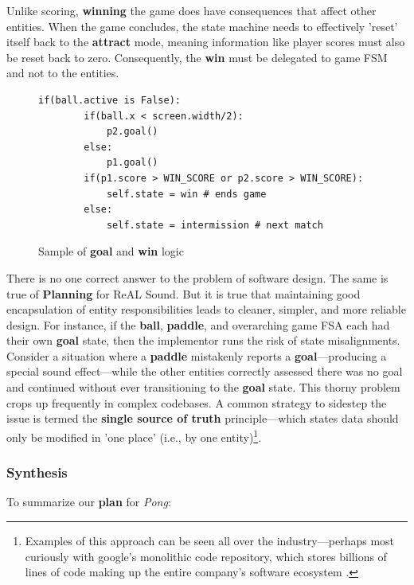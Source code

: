 \documentclass{report}
\newcommand{\rs}{ReAL Sound\xspace}
\newcommand{\plan}{\textbf{Planning}\xspace}
\newcommand{\state}[1]{\textbf{#1}}
\newcommand{\pad}{\textbf{paddle}\xspace}
\newcommand{\ball}{\textbf{ball}\xspace}
\newcommand{\tech}[1]{\textbf{#1}}
\begin{document}
Unlike scoring, \state{winning} the game does have consequences that affect other entities. When the game concludes, the state machine needs to effectively 'reset' itself back to the \state{attract} mode, meaning information like player scores must also be reset back to zero. Consequently, the \state{win} must be delegated to game FSM and not to the entities.   

\begin{figure}[h]

    \lstset{language=Python}
    \begin{lstlisting}[frame=single]
    if(ball.active is False):
        if(ball.x < screen.width/2):
            p2.goal()
        else:
            p1.goal()
        if(p1.score > WIN_SCORE or p2.score > WIN_SCORE):
            self.state = win # ends game
        else: 
            self.state = intermission # next match
    \end{lstlisting}
    
    \caption{Sample of \state{goal} and \state{win} logic}
    \label{fig:code_goal_example}
\end{figure}


There is no one correct answer to the problem of software design. The same is true of \plan for \rs. But it is true that maintaining good encapsulation of entity responsibilities leads to cleaner, simpler, and more reliable design. For instance, if the \ball, \pad, and overarching game FSA each had their own \state{goal} state, then the implementor runs the risk of state misalignments. Consider a situation where a \pad mistakenly reports a \state{goal}---producing a special sound effect---while the other entities correctly assessed there was no goal and continued without ever transitioning to the \state{goal} state. This thorny problem crops up frequently in complex codebases. A common strategy to sidestep the issue is termed the \tech{single source of truth} principle---which states data should only be modified in 'one place' (i.e., by one entity)\footnote{Examples of this approach can be seen all over the industry---perhaps most curiously with google's monolithic code repository, which stores billions of lines of code making up the entire company's software ecosystem \cite{googleRepo}.}.

\subsubsection{Synthesis}
To summarize our \state{plan} for \emph{Pong}:
\end{document}
